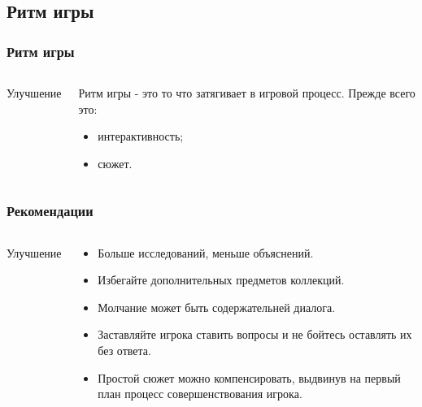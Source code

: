 \documentclass[10pt]{beamer}
\begin{document}
\subsection{Ритм игры}
\begin{frame}
\frametitle{Ритм игры}

\begin{columns}[c]

\begin{center}
  Улучшение
\end{center}

\begin{block}{}
Ритм игры - это то что затягивает в игровой процесс. Прежде всего это:
\begin{itemize}
  \item интерактивность;
  \item сюжет.
\end{itemize}

\end{block}
\end{columns}
\end{frame}

\begin{frame}
\frametitle{Рекомендации}

\begin{columns}[c]

\begin{center}
  Улучшение
\end{center}

\begin{block}{}

\begin{itemize}
  \item Больше исследований, меньше объяснений.
  \item Избегайте дополнительных предметов коллекций.
  \item Молчание может быть содержательней диалога.
  \item Заставляйте игрока ставить вопросы и не бойтесь оставлять их без ответа.
  \item Простой сюжет можно компенсировать, выдвинув на первый план процесс совершенствования игрока.
\end{itemize}

\end{block}
\end{columns}
\end{frame}
\end{document}
